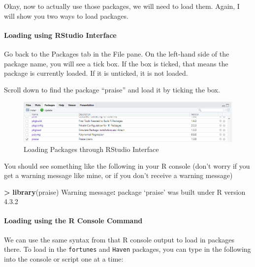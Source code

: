 \documentclass[
]{book}
\newenvironment{Shaded}{\begin{snugshade}}{\end{snugshade}}
\newcommand{\DecValTok}[1]{\textcolor[rgb]{0.00,0.00,0.81}{#1}}
\newcommand{\FloatTok}[1]{\textcolor[rgb]{0.00,0.00,0.81}{#1}}
\newcommand{\FunctionTok}[1]{\textcolor[rgb]{0.13,0.29,0.53}{\textbf{#1}}}
\newcommand{\NormalTok}[1]{#1}
\newcommand{\SpecialCharTok}[1]{\textcolor[rgb]{0.81,0.36,0.00}{\textbf{#1}}}
\begin{document}
Okay, now to actually use those packages, we will need to load them. Again, I will show you two ways to load packages.

\hypertarget{loading-using-rstudio-interface}{%
\paragraph{Loading using RStudio Interface}\label{loading-using-rstudio-interface}}

Go back to the Packages tab in the File pane. On the left-hand side of the package name, you will see a tick box. If the box is ticked, that means the package is currently loaded. If it is unticked, it is not loaded.

Scroll down to find the package ``praise'' and load it by ticking the box.

\begin{figure}
\centering
\includegraphics{img/04-praise-loaded.png}
\caption{\label{fig:unnamed-chunk-152}Loading Packages through RStudio Interface}
\end{figure}

You should see something like the following in your R console (don't worry if you get a warning message like mine, or if you don't receive a warning message)

\begin{Shaded}
\begin{Highlighting}[]
\SpecialCharTok{\textgreater{}} \FunctionTok{library}\NormalTok{(praise)}
\NormalTok{Warning message}\SpecialCharTok{:}
\NormalTok{package ‘praise’ was built under R version }\DecValTok{4}\NormalTok{.}\FloatTok{3.2} 
\end{Highlighting}
\end{Shaded}

\hypertarget{loading-using-the-r-console-command}{%
\paragraph{Loading using the R Console Command}\label{loading-using-the-r-console-command}}

We can use the same syntax from that R console output to load in packages there. To load in the \texttt{fortunes} and \texttt{Haven} packages, you can type in the following into the console or script one at a time:
\end{document}
